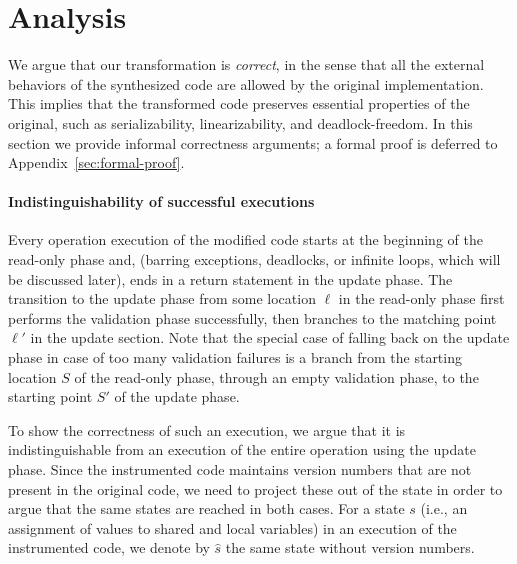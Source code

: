 \newcommand{\op}{\emph{\textsc{op}}}
\newcommand{\opt}{\textsc{opt}}

\section{Analysis}
\label{sec:proof}


We argue that our transformation is \emph{correct}, in the sense that all the external behaviors of
the synthesized code are allowed by the original implementation.
This implies that the transformed code preserves essential properties of the original, such as serializability,
linearizability, and deadlock-freedom.
In this section we provide informal correctness arguments; a formal proof is deferred to Appendix~\ref{sec:formal-proof}.

\paragraph{Indistinguishability of successful executions}
Every operation execution of the modified code starts at the beginning of the read-only phase and,
(barring exceptions, deadlocks, or infinite loops, which will be discussed later),
ends in a return statement in the update phase. The transition to the update phase
from some location $\ell$ in the read-only phase first performs the validation phase successfully, then branches
to the matching point $\ell'$ in the update section. Note that the special case of falling back on the update phase in case of too
many validation failures is a branch from the starting location $S$ of the read-only phase,
through an empty validation phase, to the starting point $S'$ of the update phase.

To show the correctness of such an execution, we argue that it is indistinguishable from an execution of the entire
operation using the  update phase. Since the instrumented code maintains version numbers that are not present in
the original code, we need to project these out of the state in order to argue that the same states are reached in
both cases. For a state $s$ (i.e., an assignment of values to shared and local variables) in an execution
of the instrumented code, we denote by $\hat{s}$ the same state without version numbers.

